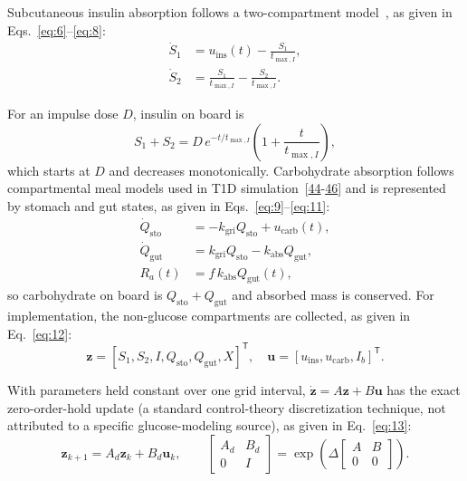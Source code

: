 \documentclass[journal]{IEEEtran}
\begin{document}
Subcutaneous insulin absorption follows a two-compartment model~\cite{ref34}, as given in Eqs.~\eqref{eq:6}--\eqref{eq:8}:
\begin{align}
\dot{S}_1 &= u_{\text{ins}}(t) - \frac{S_1}{t_{\max,I}}, \label{eq:6}\\
\dot{S}_2 &= \frac{S_1}{t_{\max,I}} - \frac{S_2}{t_{\max,I}}. \label{eq:7}
\end{align}

For an impulse dose $D$, insulin on board is
\begin{equation}
S_1 + S_2 = D\,e^{-t/t_{\max,I}}\left(1 + \frac{t}{t_{\max,I}}\right),
\label{eq:8}
\end{equation}
which starts at $D$ and decreases monotonically. Carbohydrate absorption follows compartmental meal models used in T1D simulation~[\hyperref[ref35label]{44}-\hyperref[ref37label]{46}] and is represented by stomach and gut states, as given in Eqs.~\eqref{eq:9}--\eqref{eq:11}:
\begin{align}
\dot{Q}_{\text{sto}} &= -k_{\text{gri}} Q_{\text{sto}} + u_{\text{carb}}(t), \label{eq:9}\\
\dot{Q}_{\text{gut}} &= k_{\text{gri}} Q_{\text{sto}} - k_{\text{abs}} Q_{\text{gut}}, \label{eq:10}\\
R_a(t) &= f\, k_{\text{abs}} Q_{\text{gut}}(t), \label{eq:11}
\end{align}
so carbohydrate on board is $Q_{\text{sto}} + Q_{\text{gut}}$ and absorbed mass is conserved. For implementation, the non-glucose compartments are collected, as given in Eq.~\eqref{eq:12}:
\begin{equation}
\mathbf{z} = {[S_1, S_2, I, Q_{\text{sto}}, Q_{\text{gut}}, X]}^{\mathsf T}, \quad \mathbf{u} = {[u_{\text{ins}}, u_{\text{carb}}, I_b]}^{\mathsf T}.
\label{eq:12}
\end{equation}

With parameters held constant over one grid interval, $\dot{\mathbf{z}} = A\mathbf{z} + B\mathbf{u}$ has the exact zero-order-hold update (a standard control-theory discretization technique, not attributed to a specific glucose-modeling source), as given in Eq.~\eqref{eq:13}:
\begin{equation}
\mathbf{z}_{k+1} = A_d \mathbf{z}_k + B_d \mathbf{u}_k, \qquad
\begin{bmatrix} A_d & B_d \\ 0 & I \end{bmatrix} = \exp\!\left(\Delta \begin{bmatrix} A & B \\ 0 & 0 \end{bmatrix}\right).
\label{eq:13}
\end{equation}
\end{document}

